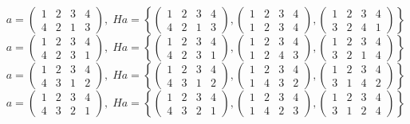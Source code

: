 \documentclass[a4paper,12pt]{article}
\begin{document}
\begin{itemize}
\[a = \begin{pmatrix} 1 & 2 & 3 & 4 \\ 4&2&1&3\end{pmatrix}, \; Ha = \left\{\begin{pmatrix} 1 & 2 & 3 & 4 \\ 4&2&1&3\end{pmatrix}, \begin{pmatrix} 1 & 2 & 3 & 4 \\ 1&2&3&4\end{pmatrix}, \begin{pmatrix} 1 & 2 & 3 & 4 \\ 3&2&4&1\end{pmatrix} \right\}\]
\[a = \begin{pmatrix} 1 & 2 & 3 & 4 \\ 4&2&3&1\end{pmatrix}, \; Ha = \left\{\begin{pmatrix} 1 & 2 & 3 & 4 \\ 4&2&3&1\end{pmatrix}, \begin{pmatrix} 1 & 2 & 3 & 4 \\ 1&2&4&3\end{pmatrix}, \begin{pmatrix} 1 & 2 & 3 & 4 \\ 3&2&1&4\end{pmatrix} \right\}\]
\[a = \begin{pmatrix} 1 & 2 & 3 & 4 \\ 4&3&1&2\end{pmatrix}, \; Ha = \left\{\begin{pmatrix} 1 & 2 & 3 & 4 \\ 4&3&1&2\end{pmatrix}, \begin{pmatrix} 1 & 2 & 3 & 4 \\ 1&4&3&2\end{pmatrix}, \begin{pmatrix} 1 & 2 & 3 & 4 \\ 3&1&4&2\end{pmatrix} \right\}\]
\[a = \begin{pmatrix} 1 & 2 & 3 & 4 \\ 4&3&2&1\end{pmatrix}, \; Ha = \left\{\begin{pmatrix} 1 & 2 & 3 & 4 \\ 4&3&2&1\end{pmatrix}, \begin{pmatrix} 1 & 2 & 3 & 4 \\ 1&4&2&3\end{pmatrix}, \begin{pmatrix} 1 & 2 & 3 & 4 \\ 3&1&2&4\end{pmatrix} \right\}\]


\end{itemize}
\end{document}
